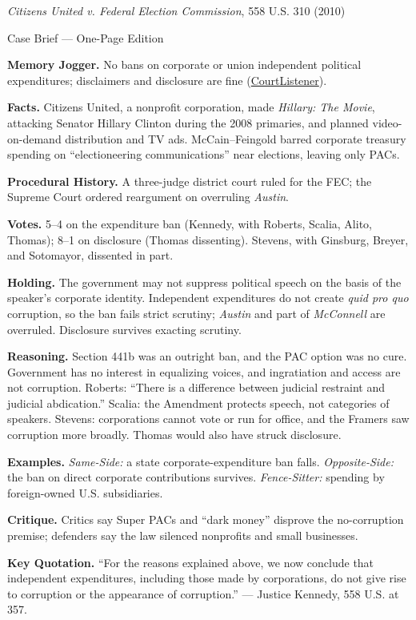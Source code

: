 \documentclass[12pt]{article}
\begin{document}
\begin{center}
{\Large \textit{Citizens United v. Federal Election Commission}, 558 U.S. 310 (2010)\par}
\vspace{0.3em}
{\normalsize Case Brief --- One-Page Edition\par}
\end{center}

\textbf{Memory Jogger.} No bans on corporate or union independent political expenditures; disclaimers and disclosure are fine (\href{https://www.courtlistener.com/opinion/1741/citizens-united-v-federal-election-commission/}{CourtListener}).

\textbf{Facts.} Citizens United, a nonprofit corporation, made \textit{Hillary: The Movie}, attacking Senator Hillary Clinton during the 2008 primaries, and planned video-on-demand distribution and TV ads. McCain--Feingold barred corporate treasury spending on ``electioneering communications'' near elections, leaving only PACs.

\textbf{Procedural History.} A three-judge district court ruled for the FEC; the Supreme Court ordered reargument on overruling \textit{Austin}.

\textbf{Votes.} 5--4 on the expenditure ban (Kennedy, with Roberts, Scalia, Alito, Thomas); 8--1 on disclosure (Thomas dissenting). Stevens, with Ginsburg, Breyer, and Sotomayor, dissented in part.

\textbf{Holding.} The government may not suppress political speech on the basis of the speaker's corporate identity. Independent expenditures do not create \textit{quid pro quo} corruption, so the ban fails strict scrutiny; \textit{Austin} and part of \textit{McConnell} are overruled. Disclosure survives exacting scrutiny.

\textbf{Reasoning.} Section 441b was an outright ban, and the PAC option was no cure. Government has no interest in equalizing voices, and ingratiation and access are not corruption. Roberts: ``There is a difference between judicial restraint and judicial abdication.'' Scalia: the Amendment protects speech, not categories of speakers. Stevens: corporations cannot vote or run for office, and the Framers saw corruption more broadly. Thomas would also have struck disclosure.

\textbf{Examples.} \emph{Same-Side:} a state corporate-expenditure ban falls. \emph{Opposite-Side:} the ban on direct corporate contributions survives. \emph{Fence-Sitter:} spending by foreign-owned U.S. subsidiaries.

\textbf{Critique.} Critics say Super PACs and ``dark money'' disprove the no-corruption premise; defenders say the law silenced nonprofits and small businesses.

\textbf{Key Quotation.} ``For the reasons explained above, we now conclude that independent expenditures, including those made by corporations, do not give rise to corruption or the appearance of corruption.'' --- Justice Kennedy, 558 U.S. at 357.
\end{document}
